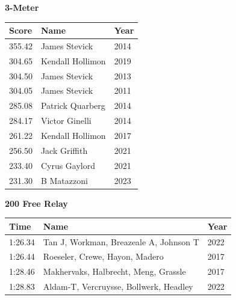 \vspace{1.2em}
\noindent\begin{minipage}[t]{0.98\textwidth}
\centering
\textbf{\textcolor{teamprimary}{3-Meter}}\par
\vspace{0.5em}
\centering
\small
\renewcommand{\arraystretch}{1.0}
\setlength{\tabcolsep}{4pt}
\begin{tabular}{@{}p{1.8cm}p{3.0cm}p{1.0cm}@{}}
\toprule
\textbf{Score} & \textbf{Name} & \textbf{Year} \\
\midrule
355.42 & James Stevick & 2014 \\
304.65 & Kendall Hollimon & 2019 \\
304.50 & James Stevick & 2013 \\
304.05 & James Stevick & 2011 \\
285.08 & Patrick Quarberg & 2014 \\
284.17 & Victor Ginelli & 2014 \\
261.22 & Kendall Hollimon & 2017 \\
256.50 & Jack Griffith & 2021 \\
233.40 & Cyrus Gaylord & 2021 \\
231.30 & B Matazzoni & 2023 \\
\bottomrule
\end{tabular}
\end{minipage}
\vspace{1.2em}
\noindent\begin{minipage}[t]{0.98\textwidth}
\centering
\textbf{\textcolor{teamprimary}{200 Free Relay}}\par
\vspace{0.5em}
\centering
\small
\renewcommand{\arraystretch}{1.0}
\setlength{\tabcolsep}{4pt}
\begin{tabular}{@{}p{4.5cm}p{8.5cm}p{2.5cm}@{}}
\toprule
\textbf{Time} & \textbf{Name} & \textbf{Year} \\
\midrule
1:26.34 & Tan J, Workman, Breazeale A, Johnson T & 2022 \\
1:26.44 & Roeseler, Crewe, Hayon, Madero & 2017 \\
1:28.46 & Makhervaks, Halbrecht, Meng, Grassle & 2017 \\
1:28.83 & Aldam-T, Vercruysse, Bollwerk, Headley & 2022 \\
\bottomrule
\end{tabular}
\end{minipage}
\vspace{1.2em}
